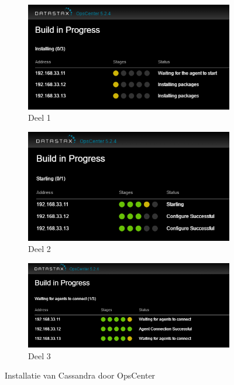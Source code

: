 \begin{figure}[H]
	\centering
	\begin{subfigure}{.49\textwidth}
  		\centering
  		\includegraphics[width=.9\linewidth]{img/4_installatie_cassandra/1_Configuration_part_4}
  		\caption{Deel 1}
	\end{subfigure}
	\begin{subfigure}{.49\textwidth}
  		\centering
  		\includegraphics[width=.9\linewidth]{img/4_installatie_cassandra/1_Configuration_part_5}
  		\caption{Deel 2}
	\end{subfigure}
	\begin{subfigure}{.49\textwidth}
  		\centering
  		\includegraphics[width=.9\linewidth]{img/4_installatie_cassandra/1_Configuration_part_6}
  		\caption{Deel 3}
	\end{subfigure}
	\caption{Installatie van Cassandra door OpsCenter}
	\label{fig:cas_install}
\end{figure}

